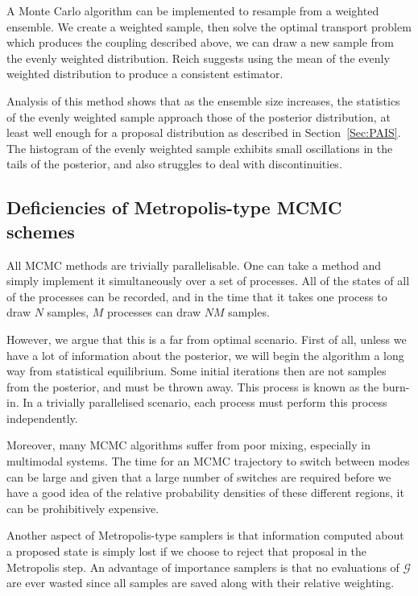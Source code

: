 \documentclass[final]{siamltex}
\begin{document}
A Monte Carlo algorithm can be implemented to resample from a weighted ensemble. We create a weighted sample, then solve the optimal transport problem which produces the coupling described above, we can draw a new sample from the evenly weighted distribution. Reich suggests using the mean of the evenly weighted distribution to produce a consistent estimator.

Analysis of this method shows that as the ensemble size increases, the statistics of the evenly weighted sample approach those of the posterior distribution, at least well enough for a proposal distribution as described in Section~\ref{Sec:PAIS}. The histogram of the evenly weighted sample exhibits small oscillations in the tails of the posterior, and also struggles to deal with discontinuities.

\subsection{Deficiencies of Metropolis-type MCMC schemes}
All MCMC methods are trivially parallelisable. One can take a method
and simply implement it simultaneously over a set of processes. All
of the states of all of the processes can be recorded, and in the time
that it takes one process to draw $N$ samples, $M$ processes can draw
$NM$ samples. 

However, we argue that this is a far from optimal
scenario. First of all, unless we have a lot of information about the posterior, we will begin the algorithm a long way from statistical equilibrium. Some initial iterations then are not samples from the posterior, and must be thrown away. This process is known as the burn-in. In a trivially parallelised scenario, each process must perform this process independently.

Moreover, many MCMC algorithms suffer from poor mixing, especially in
multimodal systems. The time for an MCMC trajectory to switch between modes can be
large and given that a large number of switches are required before we have a
good idea of the relative probability densities of these different
regions, it can be prohibitively expensive.

Another aspect of Metropolis-type samplers is that information
computed about a proposed state is simply lost if we choose to reject
that proposal in the Metropolis step. An advantage of importance
samplers is that no evaluations of $\mathcal{G}$ are ever wasted
since all samples are saved along with their relative weighting.
\end{document}
